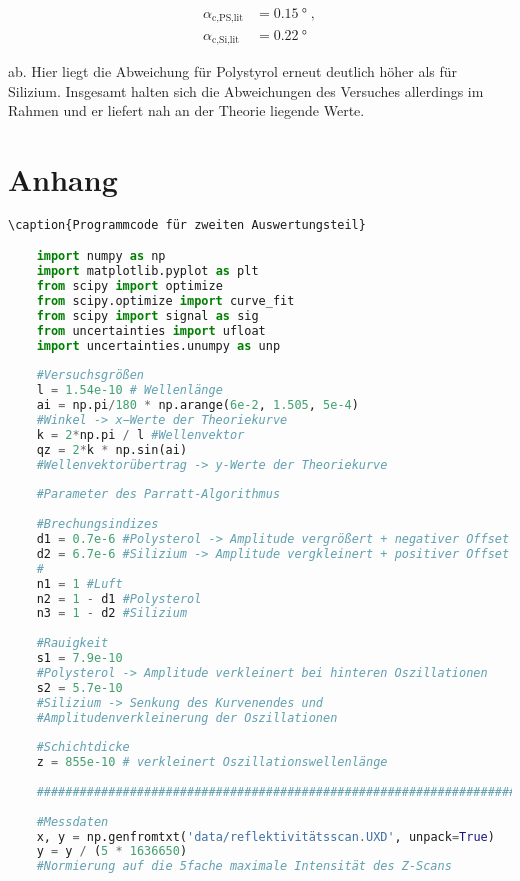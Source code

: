 \vspace{-20pt}
\begin{align*}
    \alpha_\text{c,PS,lit} &= \SI{0.15}{\degree} \; , \\
    \alpha_\text{c,Si,lit} &= \SI{0.22}{\degree}
\end{align*}

ab. Hier liegt die Abweichung für Polystyrol erneut deutlich höher
als für Silizium. Insgesamt halten sich die Abweichungen des Versuches allerdings im Rahmen
und er liefert nah an der Theorie liegende Werte.

\section{Anhang}

\begin{lstlisting}[language=Python]
    \caption{Programmcode für zweiten Auswertungsteil}

    import numpy as np
    import matplotlib.pyplot as plt
    from scipy import optimize
    from scipy.optimize import curve_fit
    from scipy import signal as sig
    from uncertainties import ufloat
    import uncertainties.unumpy as unp
    
    #Versuchsgrößen
    l = 1.54e-10 # Wellenlänge
    ai = np.pi/180 * np.arange(6e-2, 1.505, 5e-4) 
    #Winkel -> x−Werte der Theoriekurve
    k = 2*np.pi / l #Wellenvektor
    qz = 2*k * np.sin(ai) 
    #Wellenvektorübertrag -> y-Werte der Theoriekurve
    
    #Parameter des Parratt-Algorithmus
    
    #Brechungsindizes
    d1 = 0.7e-6 #Polysterol -> Amplitude vergrößert + negativer Offset
    d2 = 6.7e-6 #Silizium -> Amplitude vergkleinert + positiver Offset
    #
    n1 = 1 #Luft
    n2 = 1 - d1 #Polysterol
    n3 = 1 - d2 #Silizium
    
    #Rauigkeit
    s1 = 7.9e-10 
    #Polysterol -> Amplitude verkleinert bei hinteren Oszillationen
    s2 = 5.7e-10 
    #Silizium -> Senkung des Kurvenendes und 
    #Amplitudenverkleinerung der Oszillationen
    
    #Schichtdicke
    z = 855e-10 # verkleinert Oszillationswellenlänge
    
    #####################################################################
    
    #Messdaten
    x, y = np.genfromtxt('data/reflektivitätsscan.UXD', unpack=True)
    y = y / (5 * 1636650) 
    #Normierung auf die 5fache maximale Intensität des Z-Scans
    

\end{lstlisting}
